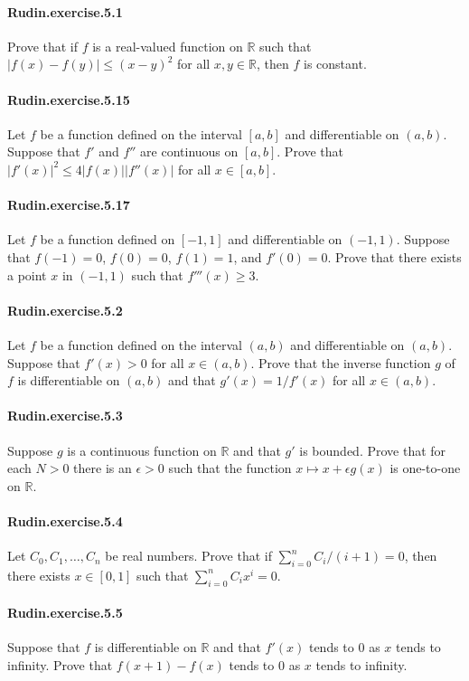 \documentclass{article}
\begin{document}
\paragraph{Rudin.exercise.5.1} Prove that if $f$ is a real-valued function on $\mathbb{R}$ such that $|f(x)-f(y)|\leq (x-y)^2$ for all $x, y \in \mathbb{R}$, then $f$ is constant.

\paragraph{Rudin.exercise.5.15} Let $f$ be a function defined on the interval $[a,b]$ and differentiable on $(a,b)$. Suppose that $f'$ and $f''$ are continuous on $[a,b]$. Prove that $|f'(x)|^2\leq 4|f(x)||f''(x)|$ for all $x\in [a,b]$.

\paragraph{Rudin.exercise.5.17} Let $f$ be a function defined on $[-1, 1]$ and differentiable on $(-1, 1)$. Suppose that $f(-1)=0$, $f(0)=0$, $f(1)=1$, and $f'(0)=0$. Prove that there exists a point $x$ in $(-1, 1)$ such that $f'''(x)\geq 3$.

\paragraph{Rudin.exercise.5.2} Let $f$ be a function defined on the interval $(a, b)$ and differentiable on $(a, b)$. Suppose that $f'(x)>0$ for all $x\in (a, b)$. Prove that the inverse function $g$ of $f$ is differentiable on $(a, b)$ and that $g'(x)=1/f'(x)$ for all $x\in (a, b)$.

\paragraph{Rudin.exercise.5.3} Suppose $g$ is a continuous function on $\mathbb{R}$ and that $g'$ is bounded. Prove that for each $N>0$ there is an $\epsilon>0$ such that the function $x\mapsto x+\epsilon g(x)$ is one-to-one on $\mathbb{R}$.

\paragraph{Rudin.exercise.5.4} Let $C_0, C_1, \dots, C_n$ be real numbers. Prove that if $\sum_{i=0}^n C_i/(i+1)=0$, then there exists $x\in [0,1]$ such that $\sum_{i=0}^n C_ix^i=0$.

\paragraph{Rudin.exercise.5.5} Suppose that $f$ is differentiable on $\mathbb{R}$ and that $f'(x)$ tends to $0$ as $x$ tends to infinity. Prove that $f(x+1)-f(x)$ tends to $0$ as $x$ tends to infinity.
\end{document}
